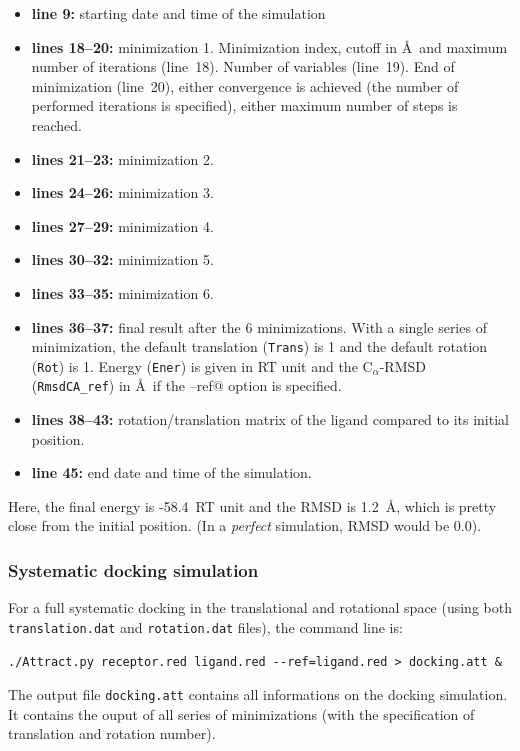 \documentclass[12pt,a4paper]{article}
\begin{document}
\begin{itemize}
\item{\bf line 9:} starting date and time of the simulation
\item{\bf lines 18--20:} minimization 1. Minimization index, cutoff 
in \AA\ and maximum number of iterations (line~18). 
Number of variables (line~19). End of minimization (line~20), either 
convergence is achieved (the number of performed iterations is specified), 
either maximum number of steps is reached.
\item{\bf lines 21--23:} minimization 2.
\item{\bf lines 24--26:} minimization 3.
\item{\bf lines 27--29:} minimization 4.
\item{\bf lines 30--32:} minimization 5.
\item{\bf lines 33--35:} minimization 6.
\item{\bf lines 36--37:} final result after the 6 minimizations. With a single series of minimization, the default translation ({\tt Trans}) is 1 and the default rotation ({\tt Rot}) is 1. 
Energy ({\tt Ener}) is given in RT unit and the C$_{\alpha}$-RMSD 
({\tt RmsdCA\_ref}) in \AA\ if the \verb@--ref@ option is specified.
\item{\bf lines 38--43:} rotation/translation matrix of the ligand compared to its initial position.
\item{\bf line 45:} end date and time of the simulation.
\end{itemize}

Here, the final energy is -58.4~RT unit and the RMSD is 1.2~\AA, which is pretty close from the initial position. (In a \emph{perfect} simulation, RMSD would
be 0.0).

\subsubsection{Systematic docking simulation}

For a full systematic docking in the translational and rotational space (using both {\tt translation.dat} and {\tt rotation.dat} files), the command line is:
\begin{verbatim}
./Attract.py receptor.red ligand.red --ref=ligand.red > docking.att &
\end{verbatim}

The output file {\tt docking.att} contains all informations on the docking simulation. 
It contains the ouput of all series of minimizations (with the specification of translation and rotation number).
\end{document}
